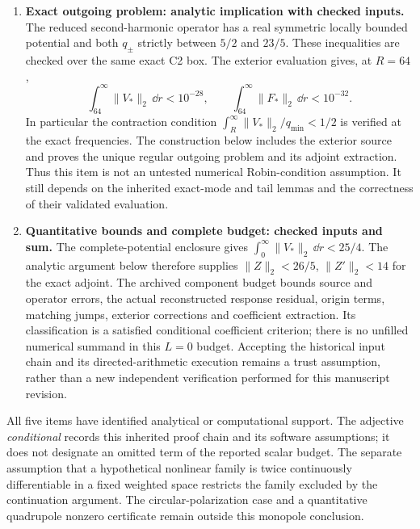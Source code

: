 \begin{enumerate}
\item\textbf{Exact outgoing problem: analytic implication with checked inputs.}
The reduced second-harmonic operator has a real symmetric locally
bounded potential and both $q_\pm$ strictly between $5/2$ and $23/5$.
These inequalities are checked over the same exact C2 box. The exterior
evaluation gives, at $R=64$,
\begin{equation}
 \int_{64}^{\infty}\|V_*\|_2\,\dd r<10^{-28},\qquad
 \int_{64}^{\infty}\|F_*\|_2\,\dd r<10^{-32}.
 \label{supp:exterior-masses}
\end{equation}
In particular the contraction condition
$\int_R^\infty\|V_*\|_2/q_{\min}<1/2$ is verified at the exact
frequencies. The construction below includes the exterior source and
proves the unique regular outgoing problem and its adjoint extraction.
Thus this item is not an untested numerical Robin-condition assumption.
It still depends on the inherited exact-mode and tail lemmas and the
correctness of their validated evaluation.

\item\textbf{Quantitative bounds and complete budget: checked inputs and sum.}
The complete-potential enclosure gives
$\int_0^\infty\|V_*\|_2\,\dd r<25/4$. The analytic argument below
therefore supplies $\|Z\|_2<26/5$, $\|Z'\|_2<14$ for the exact
adjoint. The archived component budget bounds source and operator
errors, the actual reconstructed response residual, origin terms,
matching jumps, exterior corrections and coefficient extraction.
Its classification is a satisfied conditional coefficient criterion;
there is no unfilled numerical summand in this $L=0$ budget.
Accepting the historical input chain and its directed-arithmetic
execution remains a trust assumption, rather than a new independent
verification performed for this manuscript revision.
\end{enumerate}

All five items have identified analytical or computational support.
The adjective \emph{conditional} records this inherited proof chain and
its software assumptions; it does not designate an omitted term of the
reported scalar budget. The separate assumption that a hypothetical
nonlinear family is twice continuously differentiable in a fixed
weighted space restricts the family excluded by the continuation
argument. The circular-polarization case and a quantitative quadrupole
nonzero certificate remain outside this monopole conclusion.

